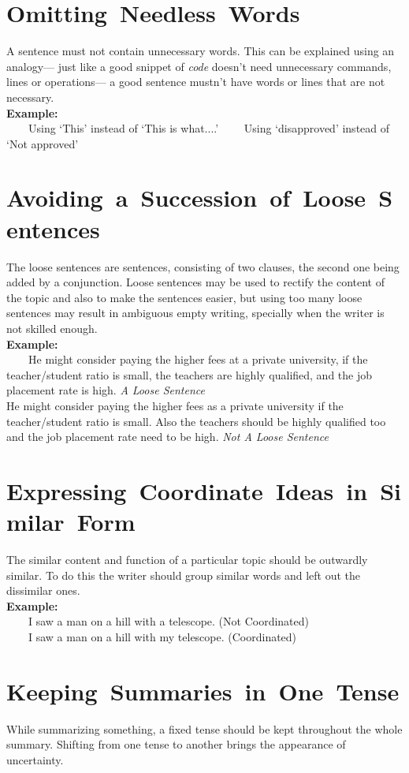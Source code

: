 \documentclass[12pt]{report}
\newcommand{\xmpl}{\textbf{Example:}\\} %
\newcommand{\indnt}{\ \ \ \ } %
\begin{document}
\section{\mbox{Omitting Needless Words}}
A sentence must not contain unnecessary words. This can be explained using an analogy--- just like a good snippet of \textit{code} doesn't need unnecessary commands, lines or operations--- a good sentence mustn't have words or lines that are not necessary.\\
\xmpl
\indnt Using `This' instead of `This is what....'
\indnt Using `disapproved' instead of `Not approved'\\


\section{\mbox{Avoiding a Succession of Loose Sentences}}
The loose sentences are sentences, consisting of two clauses, the second one being added by a conjunction. Loose sentences may be used to rectify the content of the topic and also to make the sentences easier, but using too many loose sentences may result in ambiguous empty writing, specially when the writer is not skilled enough.\\
\xmpl
\indnt He might consider paying the higher fees at a private university, if the teacher/student ratio is small, the teachers are highly qualified, and the job placement rate is high. \textit{A Loose Sentence}\\
He might consider paying the higher fees as a private university if the teacher/student ratio is small. Also the teachers should be highly qualified too and the job placement rate need to be high. \textit{Not A Loose Sentence}\\


\section{\mbox{Expressing Coordinate Ideas in Similar Form}}
The similar content and function of a particular topic should be outwardly similar. To do this the writer should group similar words and left out the dissimilar ones.\\
\xmpl
\indnt I saw a man on a hill with a telescope. (Not Coordinated)\\
\indnt I saw a man on a hill with my telescope. (Coordinated)\\


\section{\mbox{Keeping Summaries in One Tense}}
While summarizing something, a fixed tense should be kept throughout the whole summary. Shifting from one tense to another brings the appearance of uncertainty.
\end{document}

